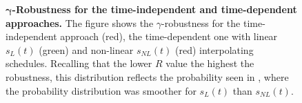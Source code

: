 
\begin{figure}[ht]
  \centering
  \caption{\textbf{$\bm{\gamma}$-Robustness for the time-independent and time-dependent approaches.} The figure shows the $\gamma$-robustness for the time-independent approach (red), the time-dependent one with linear $s_L(t)$ (green) and non-linear $s_{NL}(t)$ (red) interpolating schedules. Recalling that the lower $R$ value the highest the robustness, this distribution reflects the probability seen in , where the probability distribution was smoother for $s_L(t)$ than $s_{NL}(t)$.}
  \label{fig:gamma_robustness}
\end{figure}

